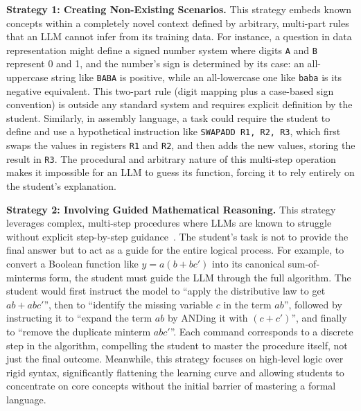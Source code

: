 \documentclass{article} %
\begin{document}
\textbf{Strategy 1: Creating Non-Existing Scenarios.} This strategy embeds known concepts within a completely novel context defined by arbitrary, multi-part rules that an LLM cannot infer from its training data. For instance, a question in data representation might define a signed number system where digits \texttt{A} and \texttt{B} represent 0 and 1, and the number's sign is determined by its case: an all-uppercase string like \texttt{BABA} is positive, while an all-lowercase one like \texttt{baba} is its negative equivalent. This two-part rule (digit mapping plus a case-based sign convention) is outside any standard system and requires explicit definition by the student. Similarly, in assembly language, a task could require the student to define and use a hypothetical instruction like \texttt{SWAPADD R1, R2, R3}, which first swaps the values in registers \texttt{R1} and \texttt{R2}, and then adds the new values, storing the result in \texttt{R3}. The procedural and arbitrary nature of this multi-step operation makes it impossible for an LLM to guess its function, forcing it to rely entirely on the student's explanation.

\textbf{Strategy 2: Involving Guided Mathematical Reasoning.} This strategy leverages complex, multi-step procedures where LLMs are known to struggle without explicit step-by-step guidance~\citep{wei2022chain, kojima2022large}. The student's task is not to provide the final answer but to act as a guide for the entire logical process. For example, to convert a Boolean function like \( y = a(b + bc') \) into its canonical sum-of-minterms form, the student must guide the LLM through the full algorithm. The student would first instruct the model to ``apply the distributive law to get \( ab + abc' \)'', then to ``identify the missing variable \( c \) in the term \( ab \)'', followed by instructing it to ``expand the term \( ab \) by ANDing it with \( (c + c') \)'', and finally to ``remove the duplicate minterm \( abc' \)''. Each command corresponds to a discrete step in the algorithm, compelling the student to master the procedure itself, not just the final outcome. Meanwhile, this strategy focuses on high-level logic over rigid syntax, significantly flattening the learning curve and allowing students to concentrate on core concepts without the initial barrier of mastering a formal language.
\end{document}
